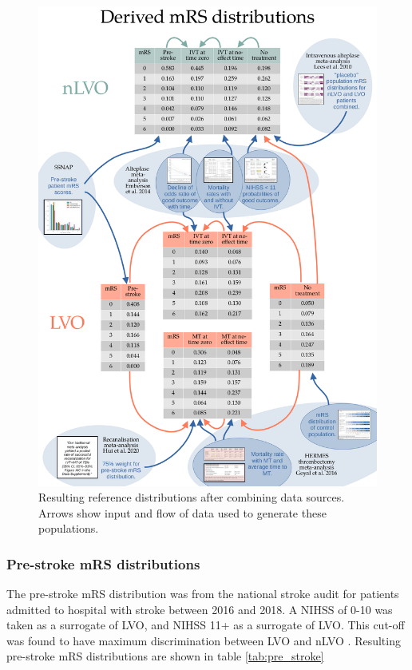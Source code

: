 \begin{figure}[h!]
    \centering
    \includegraphics[width=1.0\linewidth]{images_modelling/data_sources_summary.png}
    \caption{Resulting reference distributions after combining data sources. Arrows show input and flow of data used to generate these populations.}
    \label{fig:data_sources_summary}
\end{figure}

\subsubsection{Pre-stroke mRS distributions}

The pre-stroke mRS distribution was from the national stroke audit for patients admitted to hospital with stroke between 2016 and 2018. A NIHSS of 0-10 was taken as a surrogate of LVO, and NIHSS 11+ as a surrogate of LVO. This cut-off was found to have maximum discrimination between LVO and nLVO \cite{perez_de_la_ossa_effect_2022}. Resulting pre-stroke mRS distributions are shown in table \ref{tab:pre_stroke}

